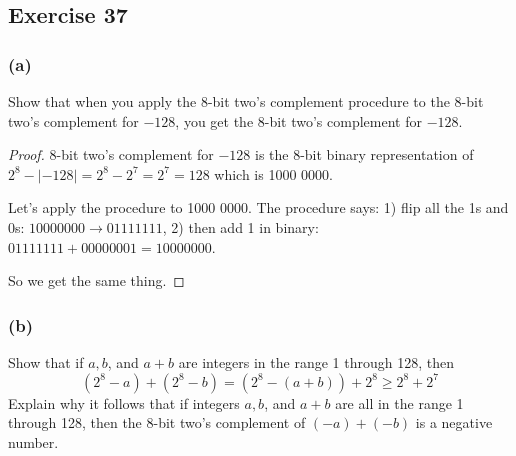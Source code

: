 \documentclass[14pt]{extarticle}
\begin{document}
\subsection{Exercise 37} \subsubsection{(a)} Show that when you apply the 8-bit
two's complement procedure to the 8-bit two’s complement for $-128$, you get the
8-bit two’s complement for $-128$.

\begin{proof} 8-bit two's complement for $-128$ is the 8-bit binary
representation of $2^8 - |-128| = 2^8 - 2^7 = 2^7 = 128$ which is 1000 0000.

Let's apply the procedure to 1000 0000. The procedure says: 1) flip all the 1s
and 0s: $1000 0000 \to 0111 1111$, 2) then add 1 in binary: $0111 1111 + 0000
0001 = 1000 0000$.

So we get the same thing. \end{proof}
\subsubsection{(b)} Show that if $a, b$, and $a + b$ are integers in the range 1
through 128, then $$ (2^8 - a) + (2^8 - b) = (2^8 - (a + b)) + 2^8 \geq 2^8 +
2^7 $$ Explain why it follows that if integers $a, b$, and $a + b$ are all in
the range 1 through 128, then the 8-bit two’s complement of $(-a) + (-b)$ is a
negative number.
\end{document}
